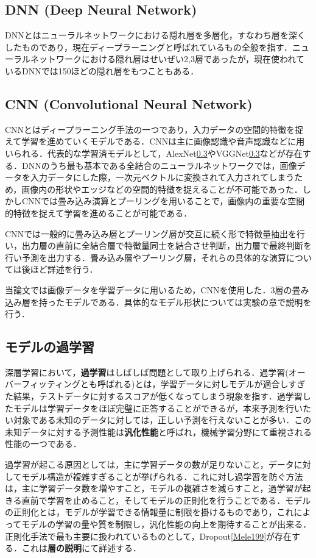 \documentclass[a4j, 11pt]{jreport}
\begin{document}
\subsection{DNN (Deep Neural Network)}
DNNとはニューラルネットワークにおける隠れ層を多層化，すなわち層を深くしたものであり，現在ディープラーニングと呼ばれているもの全般を指す．ニューラルネットワークにおける隠れ層はせいぜい2,3層であったが，現在使われているDNNでは150ほどの隠れ層をもつこともある．

\subsection{CNN (Convolutional Neural Network)}
CNNとはディープラーニング手法の一つであり，入力データの空間的特徴を捉えて学習を進めていくモデルである．CNNは主に画像認識や音声認識などに用いられる．代表的な学習済モデルとして，AlexNet\ref{}やVGGNet\ref{}などが存在する．DNNのうち最も基本である全結合のニューラルネットワークでは，画像データを入力データにした際，一次元ベクトルに変換されて入力されてしまうため，画像内の形状やエッジなどの空間的特徴を捉えることが不可能であった．しかしCNNでは畳み込み演算とプーリングを用いることで，画像内の重要な空間的特徴を捉えて学習を進めることが可能である．

CNNでは一般的に畳み込み層とプーリング層が交互に続く形で特徴量抽出を行い，出力層の直前に全結合層で特徴量同士を結合させ判断，出力層で最終判断を行い予測を出力する．畳み込み層やプーリング層，それらの具体的な演算については後ほど詳述を行う．

当論文では画像データを学習データに用いるため，CNNを使用した．3層の畳み込み層を持ったモデルである．具体的なモデル形状については実験の章で説明を行う．

\subsection{モデルの過学習}
深層学習において，\textbf{過学習}はしばしば問題として取り上げられる．過学習(オーバーフィッティングとも呼ばれる)とは，学習データに対しモデルが適合しすぎた結果，テストデータに対するスコアが低くなってしまう現象を指す．過学習したモデルは学習データをほぼ完璧に正答することができるが，本来予測を行いたい対象である未知のデータに対しては，正しい予測を行えないことが多い．この未知データに対する予測性能は\textbf{汎化性能}と呼ばれ，機械学習分野にて重視される性能の一つである．

過学習が起こる原因としては，主に学習データの数が足りないこと，データに対してモデル構造が複雑すぎることが挙げられる．これに対し過学習を防ぐ方法は，主に学習データ数を増やすこと，モデルの複雑さを減らすこと，過学習が起きる直前で学習を止めること，そしてモデルの正則化を行うことである．モデルの正則化とは，モデルが学習できる情報量に制限を掛けるものであり，これによってモデルの学習の量や質を制限し，汎化性能の向上を期待することが出来る．正則化手法で最も主要に扱われているものとして，Dropout\ref{Mele199}が存在する．これは\textbf{層の説明}にて詳述する．
\end{document}
